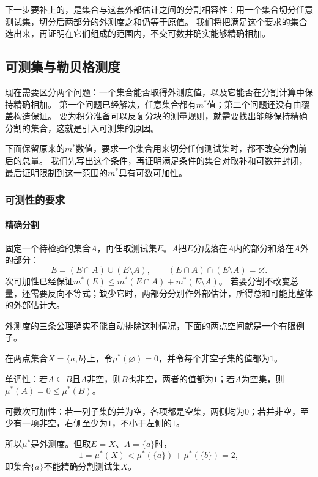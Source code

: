 下一步要补上的，是集合与这套外部估计之间的分割相容性：用一个集合切分任意测试集，切分后两部分的外测度之和仍等于原值。
我们将把满足这个要求的集合选出来，再证明在它们组成的范围内，不交可数并确实能够精确相加。

\subsection{可测集与勒贝格测度}
\label{sec:analysis-lebesgue-measurable-construction}

现在需要区分两个问题：一个集合能否取得外测度值，以及它能否在分割计算中保持精确相加。
第一个问题已经解决，任意集合都有$m^*$值；第二个问题还没有由覆盖构造保证。
要为积分准备可以反复分块的测量规则，就需要找出能够保持精确分割的集合，这就是引入可测集的原因。

下面保留原来的$m^*$数值，要求一个集合用来切分任何测试集时，都不改变分割前后的总量。
我们先写出这个条件，再证明满足条件的集合对取补和可数并封闭，最后证明限制到这一范围的$m^*$具有可数可加性。

\subsubsection{可测性的要求}

\paragraph{精确分割}

固定一个待检验的集合$A$，再任取测试集$E$。$A$把$E$分成落在$A$内的部分和落在$A$外的部分：
\[
 E=(E\cap A)\cup(E\setminus A),\qquad
 (E\cap A)\cap(E\setminus A)=\varnothing.
\]
次可加性已经保证$m^*(E)\leq m^*(E\cap A)+m^*(E\setminus A)$。
若要分割不改变总量，还需要反向不等式；缺少它时，两部分分别作外部估计，所得总和可能比整体的外部估计大。

外测度的三条公理确实不能自动排除这种情况，下面的两点空间就是一个有限例子。
\begin{example}[两点空间上不可加的外测度]
\label{ex:set-measure-two-point-outer-measure}
在两点集合$X=\{a,b\}$上，令$\mu^*(\varnothing)=0$，并令每个非空子集的值都为$1$。

单调性：若$A\subseteq B$且$A$非空，则$B$也非空，两者的值都为$1$；若$A$为空集，则$\mu^*(A)=0\leq\mu^*(B)$。

可数次可加性：若一列子集的并为空，各项都是空集，两侧均为$0$；若并非空，至少有一项非空，右侧至少为$1$，不小于左侧的$1$。

所以$\mu^*$是外测度。但取$E=X$、$A=\{a\}$时，
\[
 1=\mu^*(X)<\mu^*(\{a\})+\mu^*(\{b\})=2,
\]
即集合$\{a\}$不能精确分割测试集$X$。
\end{example}

